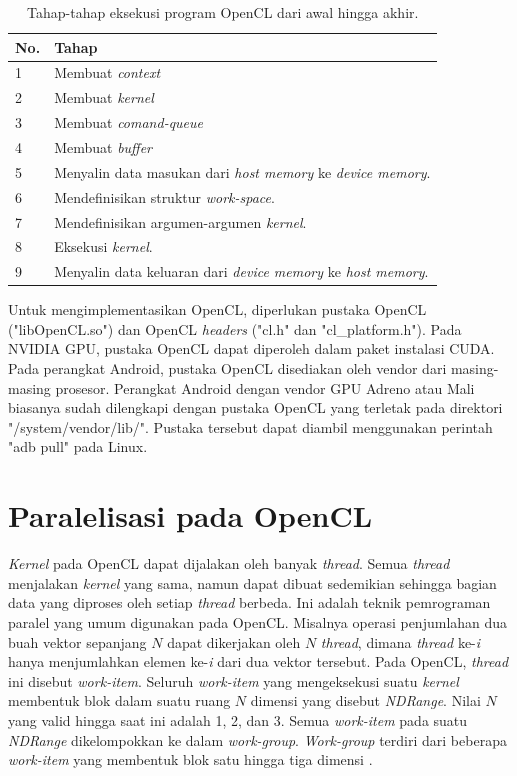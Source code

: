\begin{table}
	\centering
	\caption{Tahap-tahap eksekusi program OpenCL dari awal hingga akhir.}
	\label{tab:OpenCLexecutionorder}
	\begin{tabular}{| >{\small}l | >{\small}l |}
		\hline
		\textbf{No.} & \textbf{Tahap}\\ 
		\hline
		1 & Membuat \textit{context} \\ 
		\hline 
		2 & Membuat \textit{kernel}\\ 
		\hline 
		3 & Membuat \textit{comand-queue}\\ 
		\hline
		4 & Membuat \textit{buffer}\\ 
		\hline
		5 & Menyalin data masukan dari \textit{host memory} ke \textit{device memory}.\\
		\hline
		6 & Mendefinisikan struktur \textit{work-space}.\\
		\hline
		7 & Mendefinisikan argumen-argumen \textit{kernel}.\\
		\hline
		8 & Eksekusi \textit{kernel}. \\
		\hline
		9 & Menyalin data keluaran dari 
		\textit{device memory} ke \textit{host memory}. \\
		\hline
	\end{tabular}
\end{table}				

Untuk mengimplementasikan OpenCL, diperlukan pustaka OpenCL ("libOpenCL.so") dan OpenCL \textit{headers} ("cl.h" dan "cl\_platform.h"). Pada NVIDIA GPU, pustaka OpenCL dapat diperoleh dalam paket instalasi CUDA. Pada perangkat Android, pustaka OpenCL disediakan oleh vendor dari masing-masing prosesor. Perangkat Android dengan vendor GPU Adreno atau Mali biasanya sudah dilengkapi dengan pustaka OpenCL yang terletak pada direktori "/system/vendor/lib/". Pustaka tersebut dapat diambil menggunakan perintah "adb pull" pada Linux.

\section{Paralelisasi pada OpenCL}
\textit{Kernel} pada OpenCL dapat dijalakan oleh banyak \textit{thread}. Semua \textit{thread} menjalakan \textit{kernel} yang sama, namun dapat dibuat sedemikian sehingga bagian data yang diproses oleh setiap \textit{thread} berbeda. Ini adalah teknik pemrograman paralel yang umum digunakan pada OpenCL. Misalnya operasi penjumlahan dua buah vektor sepanjang $N$ dapat dikerjakan oleh $N$ \textit{thread}, dimana \textit{thread} ke-\textit{i} hanya menjumlahkan elemen ke-\textit{i} dari dua vektor tersebut. Pada OpenCL, \textit{thread} ini disebut \textit{work-item}. Seluruh \textit{work-item} yang mengeksekusi suatu \textit{kernel} membentuk blok dalam suatu ruang $N$ dimensi yang disebut \textit{NDRange}. Nilai $N$ yang valid hingga saat ini adalah 1, 2, dan 3. Semua \textit{work-item} pada suatu \textit{NDRange} dikelompokkan ke dalam \textit{work-group}. \textit{Work-group} terdiri dari beberapa \textit{work-item} yang membentuk blok satu hingga tiga dimensi \cite{openclguide}.


